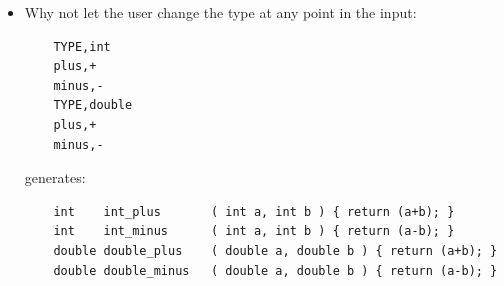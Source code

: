\documentclass[aspectratio=169]{beamer}
\newcommand{\pitem}{\pause \item}
\begin{document}
\begin{frame}[fragile]
\begin{itemize}
   \pitem
   Why not let the user change the type at any point in the input:

\tiny
\begin{verbatim}
    TYPE,int
    plus,+
    minus,-
    TYPE,double
    plus,+
    minus,-
\end{verbatim}
\small

generates:

\tiny
\begin{verbatim}
    int    int_plus       ( int a, int b ) { return (a+b); }
    int    int_minus      ( int a, int b ) { return (a-b); }
    double double_plus    ( double a, double b ) { return (a+b); }
    double double_minus   ( double a, double b ) { return (a-b); }
\end{verbatim}
\small

    \end{itemize}
\end{frame}
\end{document}
